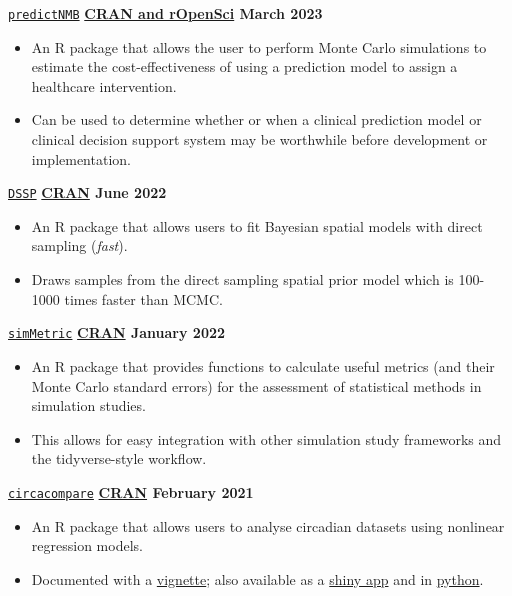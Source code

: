 \texttt{\href{https://github.com/ropensci/predictNMB}{predictNMB}} \hfill \textbf{\href{https://docs.ropensci.org/predictNMB/}{CRAN and rOpenSci} March 2023} \par
\begin{itemize}
    \item An R package that allows the user to perform Monte Carlo simulations to estimate the cost-effectiveness of using a prediction model to assign a healthcare intervention.
    \item Can be used to determine whether or when a clinical prediction model or clinical decision support system may be worthwhile before development or implementation.
\end{itemize}

\texttt{\href{https://github.com/gentrywhite/DSSP}{DSSP}} \hfill \textbf{\href{https://cran.r-project.org/package=DSSP}{CRAN} June 2022} \par
\begin{itemize}
    \item An R package that allows users to fit Bayesian spatial models with direct sampling (\textit{fast}).
    \item Draws samples from the direct sampling spatial prior model which is 100-1000 times faster than MCMC.
\end{itemize}

\texttt{\href{https://github.com/RWParsons/simMetric}{simMetric}} \hfill \textbf{\href{https://cran.r-project.org/package=simMetric}{CRAN}  January 2022} \par
\begin{itemize}
    \item An R package that provides functions to calculate useful metrics (and their Monte Carlo standard errors) for the assessment of statistical methods in simulation studies.
    \item This allows for easy integration with other simulation study frameworks and the tidyverse-style workflow.
\end{itemize}

\texttt{\href{https://github.com/RWParsons/circacompare}{circacompare}} \hfill \textbf{\href{https://cran.r-project.org/package=circacompare}{CRAN} February 2021} \par
\begin{itemize}
    \item An R package that allows users to analyse circadian datasets using nonlinear regression models.
    \item Documented with a \href{https://cran.r-project.org/web/packages/circacompare/vignettes/circacompare-vignette.html}{vignette}; also available as a \href{https://rwparsons.shinyapps.io/circacompare/}{shiny app} and in \href{https://github.com/RWParsons/circacompare_py}{python}.
\end{itemize}
